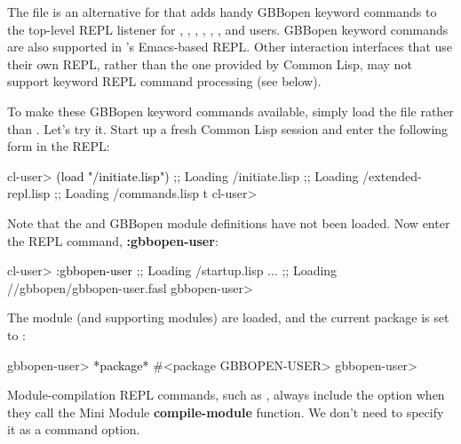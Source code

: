 \documentclass[10pt,twoside,english,pdftex]{article}
\begin{document}
The file  is an
alternative for  that adds
handy GBBopen keyword commands to the top-level REPL listener for
,
,
,
,
,
,
 and
users.  GBBopen keyword commands
are also supported in
's Emacs-based REPL.
Other interaction interfaces that use their own REPL, rather than the one
provided by Common Lisp, may not support keyword REPL command processing
(see below).

To make these GBBopen keyword commands available, simply load the file
 rather than
.  Let's try it.  Start up a fresh
Common Lisp session and enter the following form in the REPL:
%
\W\supp
\begin{example}
\textcolor{darkergray}{%
  cl-user> \textcolor{black}{(load "/initiate.lisp")}
  ;; Loading /initiate.lisp
  ;;  Loading /extended-repl.lisp
  ;;  Loading /commands.lisp
  t
  cl-user>}
\end{example}

%
%
Note that the  and GBBopen
module definitions have not been loaded.  Now enter the REPL
command, \textbf{:gbbopen-user}:
%
\W\supp
\begin{example}
\textcolor{darkergray}{%
  cl-user> \textcolor{black}{:gbbopen-user}
  ;; Loading /startup.lisp
     ...
  ;; Loading //gbbopen/gbbopen-user.fasl
  gbbopen-user>}
\end{example}
%
The  module (and supporting modules) are loaded, and the
current package is set to :
%
\W\supp\notpretop
\begin{example}
\textcolor{darkergray}{%
  gbbopen-user> \textcolor{black}{*package*}
  #<package GBBOPEN-USER>
  gbbopen-user>}
\end{example}

Module-compilation REPL commands, such as ,
always include the  option when they call the Mini Module
\textbf{compile-module} function.  We don't need to specify it as a command
option.
\end{document}
